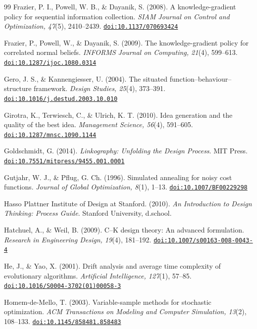 \documentclass[10pt,twocolumn]{article}
\providecommand{\doi}[1]{\href{https://doi.org/#1}{\nolinkurl{doi:#1}}}
\theoremstyle{definition}
\begin{document}
\begin{thebibliography}{99}
 Frazier, P. I., Powell, W. B., \& Dayanik, S. (2008). A knowledge-gradient policy for sequential information collection. \textit{SIAM Journal on Control and Optimization, 47}(5), 2410--2439. \doi{10.1137/070693424}

 Frazier, P., Powell, W., \& Dayanik, S. (2009). The knowledge-gradient policy for correlated normal beliefs. \textit{INFORMS Journal on Computing, 21}(4), 599--613. \doi{10.1287/ijoc.1080.0314}

 Gero, J. S., \& Kannengiesser, U. (2004). The situated function--behaviour--structure framework. \textit{Design Studies, 25}(4), 373--391. \doi{10.1016/j.destud.2003.10.010}

 Girotra, K., Terwiesch, C., \& Ulrich, K. T. (2010). Idea generation and the quality of the best idea. \textit{Management Science, 56}(4), 591--605. \doi{10.1287/mnsc.1090.1144}

 Goldschmidt, G. (2014). \textit{Linkography: Unfolding the Design Process}. MIT Press. \doi{10.7551/mitpress/9455.001.0001}

 Gutjahr, W. J., \& Pflug, G. Ch. (1996). Simulated annealing for noisy cost functions. \textit{Journal of Global Optimization, 8}(1), 1--13. \doi{10.1007/BF00229298}

 Hasso Plattner Institute of Design at Stanford. (2010). \textit{An Introduction to Design Thinking: Process Guide}. Stanford University, d.school.

 Hatchuel, A., \& Weil, B. (2009). C--K design theory: An advanced formulation. \textit{Research in Engineering Design, 19}(4), 181--192. \doi{10.1007/s00163-008-0043-4}

 He, J., \& Yao, X. (2001). Drift analysis and average time complexity of evolutionary algorithms. \textit{Artificial Intelligence, 127}(1), 57--85. \doi{10.1016/S0004-3702(01)00058-3}

 Homem-de-Mello, T. (2003). Variable-sample methods for stochastic optimization. \textit{ACM Transactions on Modeling and Computer Simulation, 13}(2), 108--133. \doi{10.1145/858481.858483}


\end{thebibliography}
\end{document}
